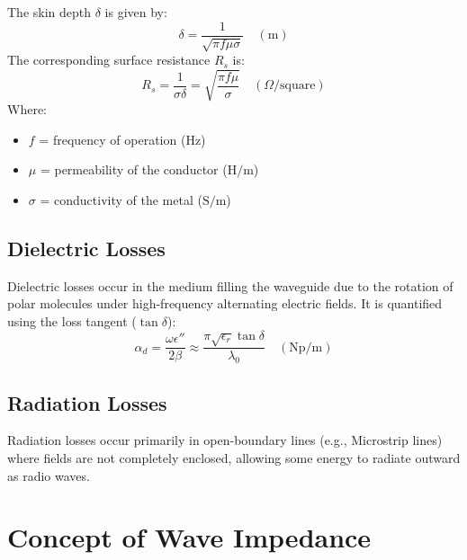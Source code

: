 \documentclass[12pt,a4paper]{article}
\begin{document}
\begin{tcolorbox}[formulabox, title={\textbf{Skin Depth and Surface Resistance}}]
The skin depth $\delta$ is given by:
\begin{equation}
  \delta = \frac{1}{\sqrt{\pi f \mu \sigma}} \quad (\text{m})
\end{equation}
The corresponding surface resistance $R_s$ is:
\begin{equation}
  R_s = \frac{1}{\sigma \delta} = \sqrt{\frac{\pi f \mu}{\sigma}} \quad (\Omega/\text{square})
\end{equation}
Where:
\begin{itemize}[leftmargin=1.5em, itemsep=1pt, topsep=2pt]
  \item[] $f$ = frequency of operation (Hz)
  \item[] $\mu$ = permeability of the conductor ($\text{H/m}$)
  \item[] $\sigma$ = conductivity of the metal ($\text{S/m}$)
\end{itemize}
\end{tcolorbox}

\subsection{Dielectric Losses}
Dielectric losses occur in the medium filling the waveguide due to the rotation of polar molecules under high-frequency alternating electric fields. It is quantified using the loss tangent ($\tan \delta$):
\begin{equation}
  \alpha_d = \frac{\omega \epsilon''}{2 \beta} \approx \frac{\pi \sqrt{\epsilon_r} \tan \delta}{\lambda_0} \quad (\text{Np/m})
\end{equation}

\subsection{Radiation Losses}
Radiation losses occur primarily in open-boundary lines (e.g., Microstrip lines) where fields are not completely enclosed, allowing some energy to radiate outward as radio waves.

\section{Concept of Wave Impedance}
\end{document}
